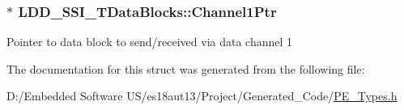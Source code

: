 \subsubsection[{Channel1\+Ptr}]{$\ast$ L\+D\+D\+\_\+\+S\+S\+I\+\_\+\+T\+Data\+Blocks\+::\+Channel1\+Ptr}\label{struct_l_d_d___s_s_i___t_data_blocks_a5c0e65fe82f88a245123217769316fef}
Pointer to data block to send/received via data channel 1 

The documentation for this struct was generated from the following file\+:\begin{DoxyCompactItemize}
\item 
D\+:/\+Embedded Software U\+S/es18aut13/\+Project/\+Generated\+\_\+\+Code/\hyperlink{_p_e___types_8h}{P\+E\+\_\+\+Types.\+h}\end{DoxyCompactItemize}
